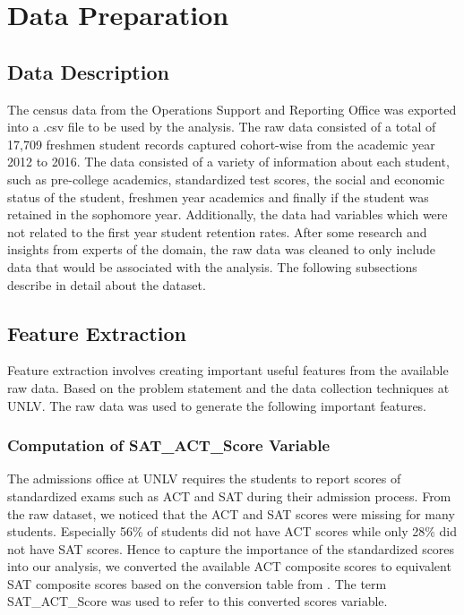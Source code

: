 \documentclass[11pt,openright]{report}
\begin{document}
\section {Data Preparation}
\subsection{Data Description}
The census data from the Operations Support and Reporting Office was exported into a .csv file to be used by the analysis. The raw data consisted of a total of 17,709 freshmen student records captured cohort-wise from the academic year 2012 to 2016. The data consisted of a variety of information about each student, such as pre-college academics, standardized test scores, the social and economic status of the student, freshmen year academics and finally if the student was retained in the sophomore year. Additionally, the data had variables which were not related to the first year student retention rates. After some research and insights from experts of the domain, the raw data was cleaned to only include data that would be associated with the analysis. The following subsections describe in detail about the dataset. 
 
\subsection{Feature Extraction}
Feature extraction involves creating important useful features from the available raw data. Based on the problem statement and the data collection techniques at UNLV. The raw data was used to generate the following important features.

\subsubsection {Computation of SAT\_ACT\_Score Variable}
The admissions office at UNLV requires the students to report scores of standardized exams such as ACT and SAT during their admission process. From the raw dataset, we noticed that the ACT and SAT scores were missing for many students. Especially 56\% of students did not have ACT scores while only 28\% did not have SAT scores. Hence to capture the importance of the standardized scores into our analysis, we converted the available ACT composite scores to equivalent 
SAT composite scores based on the conversion table from \cite{ACTSAT}. The term SAT\_ACT\_Score was used to refer to this converted scores variable.
\end{document}
